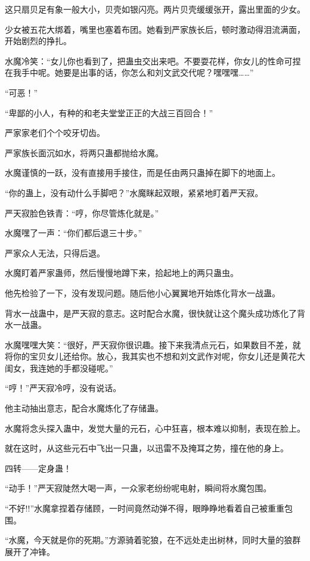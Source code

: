 \begin{this_body}
这只扇贝足有象一般大小，贝壳如银闪亮。两片贝壳缓缓张开，露出里面的少女。

少女被五花大绑着，嘴里也塞着布团。她看到严家族长后，顿时激动得泪流满面，开始剧烈的挣扎。

水魔冷笑：“女儿你也看到了，把蛊虫交出来吧。不要耍花样，你女儿的性命可捏在我手中呢。她要是出事的话，你怎么和刘文武交代呢？嘿嘿嘿……”

“可恶！”

“卑鄙的小人，有种的和老夫堂堂正正的大战三百回合！”

严家家老们个个咬牙切齿。

严家族长面沉如水，将两只蛊都抛给水魔。

水魔谨慎的一跃，没有直接用手接住，而是任由两只蛊掉在脚下的地面上。

“你的蛊上，没有动什么手脚吧？”水魔眯起双眼，紧紧地盯着严天寂。

严天寂脸色铁青：“哼，你尽管炼化就是。”

水魔嘿了一声：“你们都后退三十步。”

严家众人无法，只得后退。

水魔盯着严家蛊师，然后慢慢地蹲下来，拾起地上的两只蛊虫。

他先检验了一下，没有发现问题。随后他小心翼翼地开始炼化背水一战蛊。

背水一战蛊中，是严天寂的意志。这时配合水魔，很快就让这个魔头成功炼化了背水一战蛊。

水魔嘿嘿大笑：“很好，严天寂你很识趣。接下来我清点元石，如果数目不差，就将你的宝贝女儿还给你。放心，我其实也不想和刘文武作对呢，你女儿还是黄花大闺女，我连她的手都没碰呢。”

“哼！”严天寂冷哼，没有说话。

他主动抽出意志，配合水魔炼化了存储蛊。

水魔将念头探入蛊中，发觉大量的元石，心中狂喜，根本难以抑制，表现在脸上。

就在这时，从这些元石中飞出一只蛊，以迅雷不及掩耳之势，撞在他的身上。

四转——定身蛊！

“动手！”严天寂陡然大喝一声，一众家老纷纷呢电射，瞬间将水魔包围。

“不好!!”水魔拿捏着存储顾，一时间竟然动弹不得，眼睁睁地看着自己被重重包围。

“水魔，今天就是你的死期。”方源骑着驼狼，在不远处走出树林，同时大量的狼群展开了冲锋。

\end{this_body}

